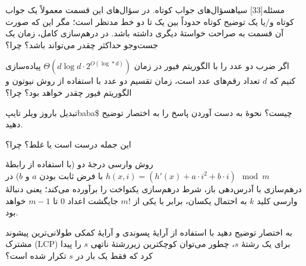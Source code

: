 ‌مسئله[33] ‌سیاه{سؤال‌های جواب کوتاه.} در سؤال‌های این قسمت معمولاً یک جواب کوتاه و/یا یک توضیح کوتاه حدوداً بین یک تا دو خط مدنظر است؛ مگر این که صورت آن قسمت به صراحت خواستۀ دیگری داشته باشد.
در درهم‌سازی کامل، زمان یک جست‌وجو حداکثر چقدر می‌تواند باشد؟ چرا؟

اگر ضرب دو عدد را با الگوریتم فیور در زمان
$\Theta(d \log d\cdot2^{O(\log*d)})$
 پیاده‌سازی کنیم که $d$ تعداد رقم‌های عدد است، زمان تقسیم دو عدد با استفاده از روش نیوتون و الگوریتم فیور چقدر خواهد بود؟ چرا؟

تبدیل باروز ویلر ‌تایپ{baba\$} چیست؟ نحوۀ به دست آوردن پاسخ را به اختصار توضیح دهید. 

\newpage
{}%
این جمله درست است یا غلط؟ چرا؟

روش وارسی درجۀ دو
(با استفاده از رابطۀ $h(x,i)=(h'(x) + a\cdot i^2+b\cdot i) \mod m$ با فرض ثابت بودن $a$ و $b$) 
در درهم‌سازی با آدرس‌دهی باز، شرط درهم‌سازی یکنواخت را برآورده می‌کند؛ یعنی دنبالۀ وارسی کلید $k$ به احتمال یکسان، برابر  با یکی از $m!$ جایگشت اعداد 0 تا $m-1$ خواهد بود.


به اختصار توضیح دهید با استفاده از آرایۀ پسوندی و آرایۀ کمکی طولانی‌ترین پیشوند مشترک (LCP) برای یک رشتۀ $s$، چطور می‌توان کوچکترین زیررشتۀ ناتهی $s$ را پیدا کرد که فقط یک بار در $s$ تکرار شده است؟

